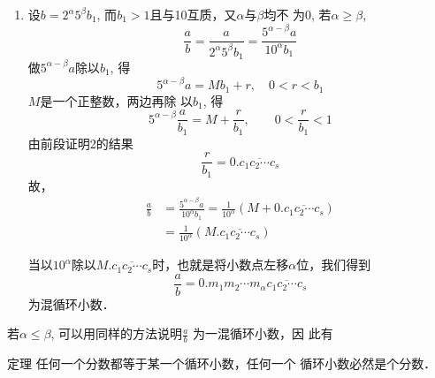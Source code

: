 \begin{enumerate}
再有$x_1<x_2<\cdots<x_{n-1}<x_n<\cdots<y_n<y_{n-1}<\cdots<y_2<y_1$，且$y_n-x_n\to 0$．

当$n$无限增大时，根据实数完备性，无限小数
\[\sum_{n=1}^{\infty}\frac{q_n}{10^n}=0.q_1q_2\cdots q_n\cdots\]
表示一实数，又因为，$d_n\to 0$, 故我们确定了一
个其值为$\frac{a}{b}$
的无限小数$0.q_1q_2\cdots q_n\cdots$．

再说明这个无限小数一定是纯循环小数，设$a=r_0$, 因为
$r_0,r_1,r_2,\ldots,r_n,\ldots$是一串大于0而小于$b$的正整数，这种正
整数只有$b-1$个不同的，所以，这一串数$r_0=a,r_1,r_2,\ldots r_n,\ldots$必然有二者会相同，就假定$r_k$为首先出现的重见余
数，假定这两个相同的余数是$r_k$和$r_i$, 即有$r_k=r_i$. 现在我
们要证明$r_i$只能是$a=r_0$, 用反证法，若$i>0$则由等式
$\frac{10r_{k-1}}{b}=q_k+\frac{r_k}{b}$和$\frac{10r_{i-1}}{b}=q_i+\frac{r_i}{b}$ 两边作减法，得到
\[\frac{10(r_{k-1}-r_{i-1})}{b}=q_k-q_i\]
因为$q_k-q_i$是整数，所以$b$能整除$10(r_{k-1}-r_{i-1})$, 由于$b$与10
互质，故$b$能整除$r_{k-1}-r_{i-1}$，但是$r_{k-1}-r_{i-1}<b$, 所以$r_{k-1}-r_{i-1}=0$, 即$r_{k-1}=r_{i-1}$重见更早，与原设$r_k$为首先出现的重
见余数不合，故$i=0$．

$\therefore\quad r_k=r_0=a$, 这样
\[\frac{a}{b}=0.\overline{q_1q_2\cdots q_{k-1}q_k}\]

\item 设$b=2^{\alpha}5^{\beta}b_1$, 而$b_1>1$且与10互质，又$\alpha$与$\beta$均不
为0, 若$\alpha\ge \beta$,
\[\frac{a}{b}=\frac{a}{2^{\alpha}5^{\beta}b_1}=\frac{5^{\alpha-\beta}a}{10^{\alpha}b_1}\]
做$5^{\alpha-\beta}a$除以$b_1$, 得
\[5^{\alpha-\beta}a=M{b_1}+{r},\quad 0<r<b_1\]
$M$是一个正整数，两边再除
以$b_1$, 得
\[5^{\alpha-\beta}\frac{a}{b_1}=M+\frac{r}{b_1},\qquad 0<\frac{r}{b_1}<1\]
由前段证明2的结果
\[\frac{r}{b_1}=0.\overline{c_1c_2\cdots c_{s}}\]
故，
\[\begin{split}
    \frac{a}{b}&=\frac{5^{\alpha-\beta}a}{10^{\alpha}b_1}=\frac{1}{10^{\alpha}}\left(M+0.\overline{c_1c_2\cdots c_{s}}\right)\\
    &=\frac{1}{10^{\alpha}}\left(M.\overline{c_1c_2\cdots c_{s}}\right)
\end{split}\]

当以$10^{\alpha}$除以$M.\overline{c_1c_2\cdots c_{s}}$时，也就是将小数点左移$\alpha$位，我们得到
\[\frac{a}{b}=0.m_1m_2\cdots m_{\alpha}\overline{c_1c_2\cdots c_{s}}\]
为混循环小数．
\end{enumerate}

若$\alpha\le \beta$, 可以用同样的方法说明$\frac{a}{b}$
为一混循环小数，因
此有
\begin{blk}{定理}
    任何一个分数都等于某一个循环小数，任何一个
循环小数必然是个分数．
\end{blk}

